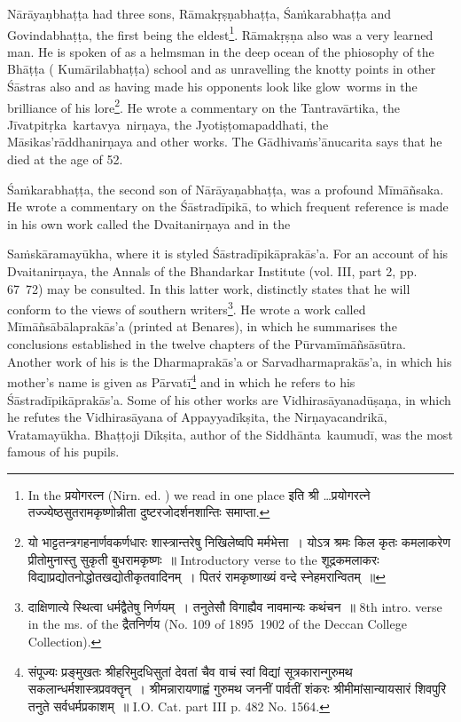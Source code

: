 \documentclass[11pt, openany]{book}
\begin{document}
Nārāyaṇbhaṭṭa had three sons, Rāmakṛṣṇabhaṭṭa, Śaṁkarabhaṭṭa and Govindabhaṭṭa, the first being the eldest\renewcommand{\thefootnote}{2}\footnote{In the प्रयोगरत्न (Nirn. ed. ) we read in one place इति श्री \ldots प्रयोगरत्ने तज्ज्येष्ठसुतरामकृष्णोन्नीता दुष्टरजोदर्शनशान्तिः समाप्ता.}. Rāmakṛṣṇa also was a very learned man. He is spoken of as a helmsman in the deep ocean of the phiosophy of the Bhāṭṭa ( Kumārilabhaṭṭa) school and as unravelling the knotty points in other Śāstras also and as having made his opponents look like glow\textendash\ worms in the brilliance of his lore\renewcommand{\thefootnote}{3}\footnote{यो भाट्टतन्त्रगहनार्णवकर्णधारः शास्त्रान्तरेषु निखिलेष्वपि मर्मभेत्ता~। योऽत्र श्रमः किल कृतः कमलाकरेण प्रीतोमुनास्तु सुकृती बुधरामकृष्णः~॥ Introductory verse to the शूद्रकमलाकरः विद्याप्रद्योतनोद्धोतखद्योतीकृतवादिनम्~। पितरं रामकृष्णाख्यं वन्दे स्नेहमरान्वितम्~॥}. He wrote a commentary on the Tantravārtika, the Jīvatpitṛka\textendash\ kartavya\textendash\ nirṇaya, the Jyotiṣṭomapaddhati, the Māsikas'rāddhanirṇaya and other works. The Gādhivaṁs'ānucarita says that he died at the age of 52.

Śaṁkarabhaṭṭa, the second son of Nārāyaṇabhaṭṭa, was a profound Mīmāñsaka. He wrote a commentary on the Śāstradīpikā, to which frequent reference is made in his own work called the Dvaitanirṇaya and in the

\newpage

\noindent
Saṁskāramayūkha, where it is styled Śāstradīpikāprakās'a. For an account of his Dvaitanirṇaya, the Annals of the Bhandarkar Institute (vol. III, part 2, pp. 67\textendash\ 72) may be consulted. In this latter work, distinctly states that he will conform to the views of southern writers\renewcommand{\thefootnote}{1}\footnote{दाक्षिणात्ये स्थित्वा धर्मद्वैतेषु निर्णयम्~। तनुतेसौ विगाह्यैव नावमान्यः कथंचन~॥ 8th intro. verse in the ms. of the द्रैतनिर्णय (No. 109 of 1895\textendash\ 1902 of the Deccan College Collection).}. He wrote a work called Mīmāñsābālaprakās'a (printed at Benares), in which he summarises the conclusions established in the twelve chapters of the Pūrvamīmāñsāsūtra. Another work of his is the Dharmaprakās'a or Sarvadharmaprakās'a, in which his mother's name is given as Pārvatī\renewcommand{\thefootnote}{2}\footnote{संपूज्यः प्रङ्मुखतः श्रीहरिमुदधिसुतां देवतां चैव वाचं स्वां विद्यां सूत्रकारान्गुरुमथ सकलान्धर्मशास्त्रप्रवक्तॄन्~। श्रीमन्नारायणाह्वं गुरुमथ जननीं पार्वतीं शंकरः श्रीमीमांसान्यायसारं शिवपुरि तनुते सर्वधर्मप्रकाशम्~॥ I.O. Cat. part III p. 482 No. 1564.} and in which he refers to his Śāstradīpikāprakās'a. Some of his other works are Vidhirasāyanadūṣaṇa, in which he refutes the Vidhirasāyana of Appayyadīkṣita, the Nirṇayacandrikā, Vratamayūkha. Bhaṭṭoji Dīkṣita, author of the Siddhānta\textendash\ kaumudī, was the most famous of his pupils.
\end{document}
